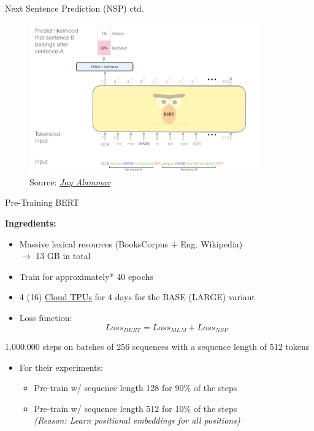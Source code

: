 
\begin{vbframe}{Next Sentence Prediction (NSP) ctd.}

\vfill

	\begin{figure}
		\centering
		\includegraphics[width = 10cm]{figure/bert-nsp.png}\\ 
		\footnotesize{Source:} \href{https://jalammar.github.io/illustrated-bert/}{\footnotesize \it Jay Alammar}
	\end{figure}

\vfill

\end{vbframe}


\begin{frame}{Pre-Training BERT}

\textbf{Ingredients:}

\begin{itemize}
	\item Massive lexical resources (BooksCorpus $+$ Eng. Wikipedia)\\
				$\rightarrow$ 13 GB in total
	\item Train for approximately* 40 epochs
	\item 4 (16) \href{https://cloud.google.com/tpu/}{Cloud TPUs} for 4 days for the BASE (LARGE) variant
	\item Loss function: $$Loss_{BERT} = Loss_{MLM} + Loss_{NSP}$$
\end{itemize}
				\vspace{.3cm}
				{\scriptsize *1.000.000 steps on batches of 256 sequences with a sequence length of 512 tokens}
\begin{itemize}
	\item For their experiments:
		\begin{itemize}
			\item Pre-train w/ sequence length 128 for 90\% of the steps
			\item Pre-train w/ sequence length 512 for 10\% of the steps \\
						\textit{(Reason: Learn positional embeddings for all positions)}
		\end{itemize}
\end{itemize}
\end{frame}

